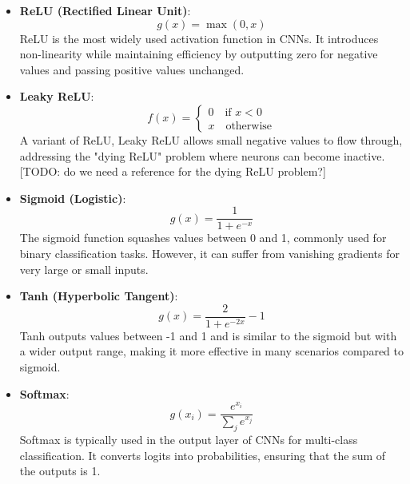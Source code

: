 \begin{itemize}
    \item \textbf{ReLU (Rectified Linear Unit)}: \label{theoretical_activations_relu}
    \begin{equation}
    g(x) = \max(0, x)
    \end{equation}
    ReLU is the most widely used activation function in CNNs. It introduces non-linearity while maintaining efficiency by outputting zero for negative values and passing positive values unchanged.

    \item \textbf{Leaky ReLU}: \label{theoretical_activations_leakyrelu}
    \begin{equation}
        f(x) =
        \begin{cases}
        0 \quad \text{if } x < 0 \\
        x \quad \text{otherwise}
        \end{cases}
    \end{equation}
    A variant of ReLU, Leaky ReLU allows small negative values to flow through, addressing the "dying ReLU" problem where neurons can become inactive. [TODO: do we need a reference for the dying ReLU problem?]

    \item \textbf{Sigmoid (Logistic)}:  \label{theoretical_activations_sigmoid}
    \begin{equation}
        g(x) = \frac{1}{1 + e^{-x}}
    \end{equation}
    The sigmoid function squashes values between 0 and 1, commonly used for binary classification tasks. However, it can suffer from vanishing gradients for very large or small inputs.

    \item \textbf{Tanh (Hyperbolic Tangent)}:  \label{theoretical_activations_tanh}
    \begin{equation}
        g(x) = \frac{2}{1 + e^{-2x}} - 1
    \end{equation}
    Tanh outputs values between -1 and 1 and is similar to the sigmoid but with a wider output range, making it more effective in many scenarios compared to sigmoid.

    \item \textbf{Softmax}: \label{theoretical_activations_softmax}
    \begin{equation}
        g(x_i) = \frac{e^{x_i}}{\sum_{j} e^{x_j}}
    \end{equation}
    Softmax is typically used in the output layer of CNNs for multi-class classification. It converts logits into probabilities, ensuring that the sum of the outputs is 1.


\end{itemize}
